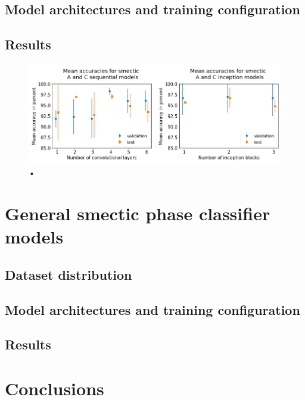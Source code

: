 \documentclass[12pt]{article}
\begin{document}
\subsection{Model architectures and training configuration}

\subsection{Results}
\begin{figure}[h]
	\centering
    \includegraphics[width=6.6in]{images/smecticAC_graphs.png}
    \caption{•}
\end{figure} 
\section{General smectic phase classifier models}
\subsection{Dataset distribution}

\subsection{Model architectures and training configuration}

\subsection{Results}

\section{Conclusions}

\end{document}
